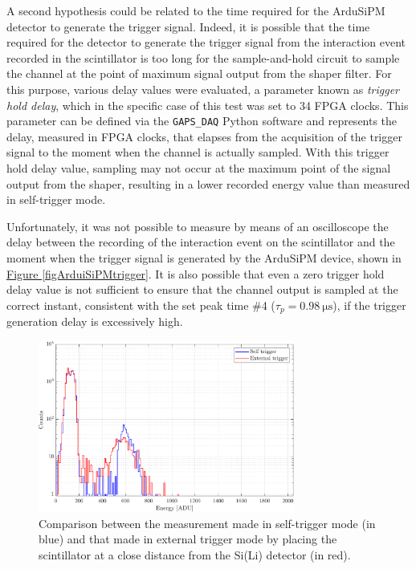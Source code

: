 \par
A second hypothesis could be related to the time required for the ArduSiPM detector to generate the trigger signal. Indeed, it is possible that the time required for the detector to generate the trigger signal from the interaction event recorded in the scintillator is too long for the sample-and-hold circuit to sample the channel at the point of maximum signal output from the shaper filter. For this purpose, various delay values were evaluated, a parameter known as \textit{trigger hold delay}, which in the specific case of this test was set to 34 FPGA clocks. This parameter can be defined via the \texttt{GAPS\_DAQ} Python software and represents the delay, measured in FPGA clocks, that elapses from the acquisition of the trigger signal to the moment when the channel is actually sampled. With this trigger hold delay value, sampling may not occur at the maximum point of the signal output from the shaper, resulting in a lower recorded energy value than measured in self-trigger mode. 

\par
Unfortunately, it was not possible to measure by means of an oscilloscope the delay between the recording of the interaction event on the scintillator and the moment when the trigger signal is generated by the ArduSiPM device, shown in \hyperref[figArduiSiPMtrigger]{Figure \ref{figArduiSiPMtrigger}}. It is also possible that even a zero trigger hold delay value is not sufficient to ensure that the channel output is sampled at the correct instant, consistent with the set peak time \#4 ($\tau_{p} = \SI{0.98}{\micro\second}$), if the trigger generation delay is excessively high.

\begin{figure}[h!]
    \centering
    \includegraphics[width=0.75\textwidth]{Images/chap3/results/muons/ext_self_muons_THR_130_delay_34_ch0-7.pdf}
    \caption{Comparison between the measurement made in self-trigger mode (in blue) and that made in external trigger mode by placing the scintillator at a close distance from the Si(Li) detector (in red).}
    \label{figMUONselfExtComparativaCH0-7}
\end{figure}

